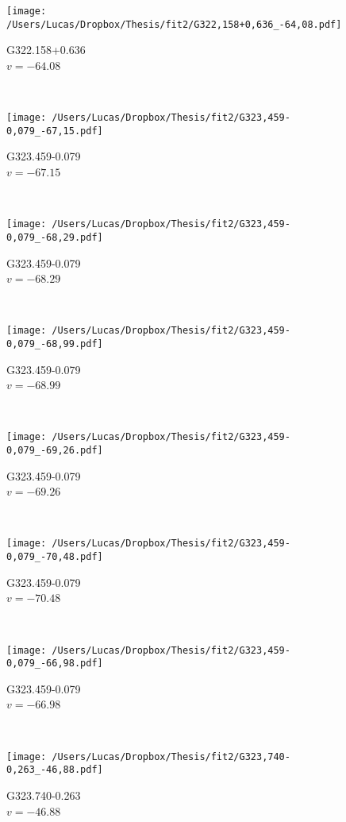 \begin{figure*}[t]\ContinuedFloat
	\centering
	\begin{subfigure}[t]{0.3\textwidth}
		\texttt{[image: /Users/Lucas/Dropbox/Thesis/fit2/G322,158+0,636\_-64,08.pdf]}
		\caption[]{G322.158+0.636\\$v=-64.08$\,\kms}
	\end{subfigure}
	~
	\begin{subfigure}[t]{0.3\textwidth}
		\texttt{[image: /Users/Lucas/Dropbox/Thesis/fit2/G323,459-0,079\_-67,15.pdf]}
		\caption[]{G323.459-0.079\\$v=-67.15$\,\kms}
	\end{subfigure}
	~
	\begin{subfigure}[t]{0.3\textwidth}
		\texttt{[image: /Users/Lucas/Dropbox/Thesis/fit2/G323,459-0,079\_-68,29.pdf]}
		\caption[]{G323.459-0.079\\$v=-68.29$\,\kms}
	\end{subfigure}
	~
	\begin{subfigure}[t]{0.3\textwidth}
		\texttt{[image: /Users/Lucas/Dropbox/Thesis/fit2/G323,459-0,079\_-68,99.pdf]}
		\caption[]{G323.459-0.079\\$v=-68.99$\,\kms}
	\end{subfigure}
	~
	\begin{subfigure}[t]{0.3\textwidth}
		\texttt{[image: /Users/Lucas/Dropbox/Thesis/fit2/G323,459-0,079\_-69,26.pdf]}
		\caption[]{G323.459-0.079\\$v=-69.26$\,\kms}
	\end{subfigure}
	~
	\begin{subfigure}[t]{0.3\textwidth}
		\texttt{[image: /Users/Lucas/Dropbox/Thesis/fit2/G323,459-0,079\_-70,48.pdf]}
		\caption[]{G323.459-0.079\\$v=-70.48$\,\kms}
	\end{subfigure}
	~
	\begin{subfigure}[t]{0.3\textwidth}
		\texttt{[image: /Users/Lucas/Dropbox/Thesis/fit2/G323,459-0,079\_-66,98.pdf]}
		\caption[]{G323.459-0.079\\$v=-66.98$\,\kms}
	\end{subfigure}
	~
	\begin{subfigure}[t]{0.3\textwidth}
		\texttt{[image: /Users/Lucas/Dropbox/Thesis/fit2/G323,740-0,263\_-46,88.pdf]}
		\caption[]{G323.740-0.263\\$v=-46.88$\,\kms}

\end{subfigure}
\end{figure*}
